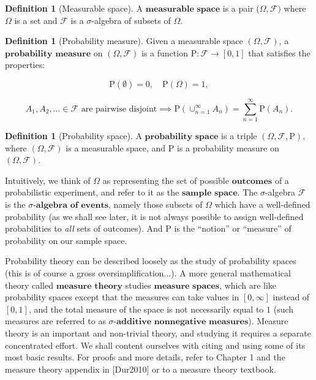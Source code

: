 \documentclass[11pt]{report}
\providecommand{\cal}{\mathcal}
\theoremstyle{plain}
\theoremstyle{definition}
\newtheorem{defn}[thm]{Definition}
\begin{document}
\begin{defn}[Measurable space]
A $\textbf{measurable space}$ is a pair
($\Omega,{\cal F})$ where $\Omega$ is a set and
${\cal F}$ is a $\sigma$-algebra of subsets of
$\Omega$.
\end{defn}

\begin{defn}[Probability measure]
Given a measurable space $(\Omega, {\cal F})$, a
$\textbf{probability measure}$ on $(\Omega, {\cal F})$
is a function $\mathrm{P}:{\cal F}\to[0,1]$ that
satisfies the properties:

\begin{equation*}
\mathrm{P}(\emptyset) = 0, \quad \mathrm{P}(\Omega) = 1,
\tag{P1}
\end{equation*}

\begin{equation*}
A_1, A_2, \ldots \in {\cal F}\textrm{ are pairwise disjoint} \implies
\mathrm{P}(\cup_{n=1}^\infty A_n) = \sum_{n=1}^\infty \mathrm{P}(A_n).
\tag{P2}
\end{equation*}

\end{defn}

\begin{defn}[Probability space]
A $\textbf{probability space}$ is a triple
$(\Omega, {\cal F}, \mathrm{P})$, where
$(\Omega, {\cal F})$ is a measurable space, and
$\mathrm{P}$ is a probability measure on
$(\Omega, {\cal F})$.
\end{defn}

\noindent Intuitively, we think of $\Omega$ as representing the
set of possible $\textbf{outcomes}$ of a
probabilistic experiment, and refer to it as the
$\textbf{sample space}$. The $\sigma$-algebra
${\cal F}$ is the $\textbf{$\sigma
$-algebra of events}$, namely those subsets of
$\Omega$ which have a well-defined probability (as we
shall see later, it is not always possible to assign
well-defined probabilities to \emph{all} sets of outcomes).
And $\mathrm{P}$ is the ``notion'' or ``measure'' of
probability on our sample space.

Probability theory can be described loosely as the
study of probability spaces (this is of course a gross
oversimplification...). A more general mathematical
theory called $\textbf{measure theory}$ studies
$\textbf{measure spaces}$, which are like probability
spaces except that the measures can take values in
$[0,\infty]$ instead of $[0,1]$, and the total
measure of the space is not necessarily equal to $1$
(such measures are referred to as $\textbf{$\sigma
$-additive nonnegative measures}$). Measure theory is
an important and non-trivial theory, and studying it
requires a separate concentrated effort. We shall
content ourselves with citing and using some of its
most basic results. For proofs and more details, refer
to Chapter 1 and the measure theory appendix in
[Dur2010] or to a measure theory textbook.
\end{document}
